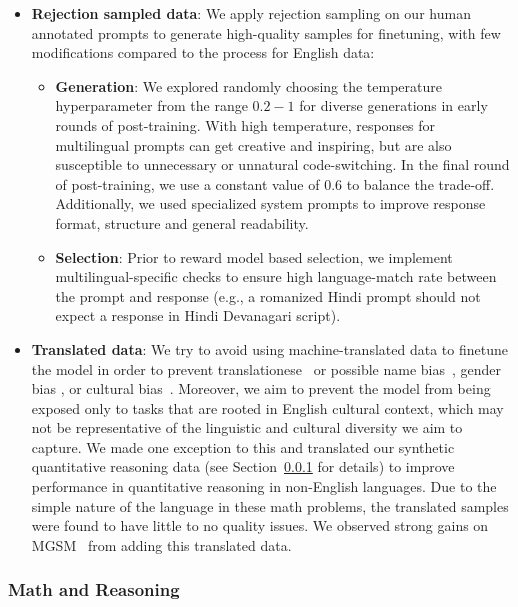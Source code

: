 \begin{itemize}
        \item \textbf{Rejection sampled data}: We apply rejection sampling on our human annotated prompts to generate high-quality samples for finetuning, with few modifications compared to the process for English data: 
            \begin{itemize} 
                \item \textbf{Generation}: 
                We explored randomly choosing the temperature hyperparameter from the range $0.2-1$ for diverse generations in early rounds of post-training. With high temperature, responses for multilingual prompts can get creative and inspiring, but are also susceptible to unnecessary or unnatural code-switching. In the final round of post-training, we use a constant value of 0.6 to balance the trade-off. Additionally, we used specialized system prompts to improve response format, structure and general readability. 
                \item \textbf{Selection}: Prior to reward model based selection, we implement multilingual-specific checks to ensure high language-match rate between the prompt and response (e.g., a romanized Hindi prompt should not expect a response in Hindi Devanagari script). 
            \end{itemize}
        \item \textbf{Translated data}: We try to avoid using machine-translated data to finetune the model in order to prevent translationese~\citep{bizzoni-etal-2020-human,muennighoff2023crosslingual} or possible name bias~\citep{wang-etal-2022-measuring}, gender bias \citep{10.1162/tacl_a_00401}, or cultural bias~\citep{Ji_Ji_Bouillon_Seligman_2023}. Moreover, we aim to prevent the model from being exposed only to tasks that are rooted in English cultural context, which may not be representative of the linguistic and cultural diversity we aim to capture. We made one exception to this and translated our synthetic quantitative reasoning data (see Section~\ref{subsubsec:reasoning} for details) to improve performance in quantitative reasoning in non-English languages. Due to the simple nature of the language in these math problems, the translated samples were found to have little to no quality issues. We observed strong gains on MGSM~\citep{shi2022languagemodelsmultilingualchainofthought} from adding this translated data. 
\end{itemize}

\subsubsection{Math and Reasoning}
\label{subsubsec:reasoning}

